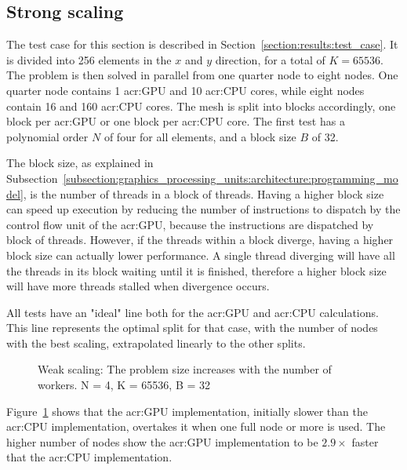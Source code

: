 \subsection{Strong scaling} \label{subsection:results:scaling_tests:strong}

The test case for this section is described in Section~\ref{section:results:test_case}. It is
divided into 256 elements in the $x$ and $y$ direction, for a total of $K = 65536$. The problem is
then solved in parallel from one quarter node to eight nodes. One quarter node contains 1
\acrshort{acr:GPU} and 10 \acrshort{acr:CPU} cores, while eight nodes contain 16
 and 160 \acrshort{acr:CPU} cores. The mesh is split into blocks accordingly,
one block per \acrshort{acr:GPU} or one block per \acrshort{acr:CPU} core. The first test has a
polynomial order $N$ of four for all elements, and a block size $B$ of 32. 

The block size, as explained in
Subsection~\ref{subsection:graphics_processing_units:architecture:programming_model}, is the number
of threads in a block of threads. Having a higher block size can speed up execution by reducing the
number of instructions to dispatch by the control flow unit of the \acrshort{acr:GPU}, because the
instructions are dispatched by block of threads. However, if the threads within a block diverge,
having a higher block size can actually lower performance. A single thread diverging will have all
the threads in its block waiting until it is finished, therefore a higher block size will have more
threads stalled when divergence occurs.

All tests have an "ideal" line both for the \acrshort{acr:GPU} and \acrshort{acr:CPU} calculations.
This line represents the optimal split for that case, with the number of nodes with the best
scaling, extrapolated linearly to the other splits.

\begin{figure}[H]
	\centering
	
	\caption{Weak scaling: The problem size increases with the number of workers. N = 4, K = 65536, B = 32}
	\label{fig:strong_scaling_N4_W32}
\end{figure}

Figure~\ref{fig:strong_scaling_N4_W32} shows that the \acrshort{acr:GPU} implementation, initially
slower than the \acrshort{acr:CPU} implementation, overtakes it when one full node or more is used.
The higher number of nodes show the \acrshort{acr:GPU} implementation to be $2.9 \times$ faster that
the \acrshort{acr:CPU} implementation.

